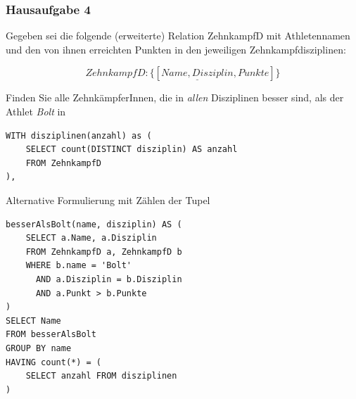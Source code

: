 \begin{frame}[fragile]
	\frametitle{Hausaufgabe 4}
	\vspace{0.5cm}

	\begin{multicols}{2}
		Gegeben sei die folgende (erweiterte) Relation ZehnkampfD mit 
		Athletennamen und den von ihnen erreichten Punkten in den jeweiligen Zehnkampfdisziplinen:

		\[ ZehnkampfD: \{[ \underline{Name, Disziplin}, Punkte ]\} \]

		Finden Sie alle ZehnkämpferInnen, die in \textit{allen} Disziplinen besser sind,
		als der Athlet \textit{Bolt} in
		\begin{verbatim}
WITH disziplinen(anzahl) as (
	SELECT count(DISTINCT disziplin) AS anzahl
	FROM ZehnkampfD
),
		\end{verbatim}
		\vfill\columnbreak
		Alternative Formulierung mit Zählen der Tupel
		\begin{verbatim}
besserAlsBolt(name, disziplin) AS (
	SELECT a.Name, a.Disziplin
	FROM ZehnkampfD a, ZehnkampfD b
	WHERE b.name = 'Bolt'
	  AND a.Disziplin = b.Disziplin
	  AND a.Punkt > b.Punkte
)
SELECT Name 
FROM besserAlsBolt
GROUP BY name
HAVING count(*) = (
	SELECT anzahl FROM disziplinen
)
		\end{verbatim}
	\end{multicols}
\end{frame}
